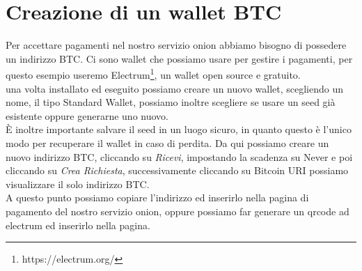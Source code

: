 \section{Creazione di un wallet BTC}
Per accettare pagamenti nel nostro servizio onion abbiamo bisogno di possedere un indirizzo BTC. 
Ci sono wallet che possiamo usare per gestire i pagamenti, per questo esempio useremo Electrum\footnote{https://electrum.org/}, un wallet open source e gratuito.\\
una volta installato ed eseguito possiamo creare un nuovo wallet, scegliendo un nome, il tipo Standard Wallet, possiamo inoltre scegliere se usare un seed già esistente oppure generarne uno nuovo.\\
È inoltre importante salvare il seed in un luogo sicuro, in quanto questo è l'unico modo per recuperare il wallet in caso di perdita.
Da qui possiamo creare un nuovo indirizzo BTC, cliccando su \textit{Ricevi}, impostando la scadenza su Never e poi cliccando su \textit{Crea Richiesta}, successivamente cliccando su Bitcoin URI possiamo visualizzare il solo indirizzo BTC. 
\\
A questo punto possiamo copiare l'indirizzo ed inserirlo nella pagina di pagamento del nostro servizio onion, oppure possiamo far generare un qrcode ad electrum ed inserirlo nella pagina.

